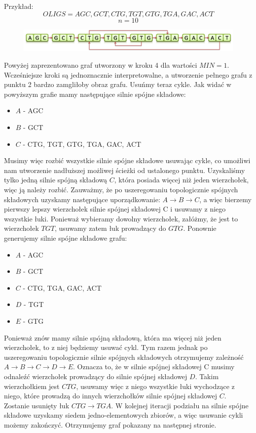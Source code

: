 \documentclass[a4paper,10pt]{article}
\begin{document}
Przykład:
$$OLIGS = { AGC, GCT, CTG, TGT, GTG, TGA, GAC, ACT }$$
$$n = 10$$

\begin{figure}[h]
  \footnotesize\centering
  \includegraphics[width=\textwidth,keepaspectratio]{Graph1.png}
\end{figure}

Powyżej zaprezentowano graf utworzony w kroku 4 dla wartości $MIN=1$. Wcześniejsze kroki są jednoznacznie interpretowalne, a utworzenie pełnego grafu z punktu 2 bardzo zamgliłoby obraz grafu. Usuńmy teraz cykle.
Jak widać w powyższym grafie mamy następujące silnie spójne składowe:
\begin{itemize}
 \item $A$ - {AGC}
 \item $B$ - {GCT}
 \item $C$ - {CTG, TGT, GTG, TGA, GAC, ACT}
\end{itemize}
Musimy więc rozbić wszystkie silnie spójne składowe usuwając cykle, co umożliwi nam utworzenie nadłuższej możliwej ścieżki od ustalonego punktu.
Uzyskaliśmy tylko jedną silnie spójną składową $C$, która posiada więcej niż jeden wierzchołek, więc ją należy rozbić. 
Zauważmy, że po uszeregowaniu topologicznie spójnych składowych uzyskamy następujące uporządkowanie: $A \rightarrow B \rightarrow C$, 
a więc bierzemy pierwszy lepszy wierzchołek silnie spójnej składowej C i usuwamy z niego wszystkie łuki. 
Ponieważ wybieramy dowolny wierzchołek, załóżmy, że jest to wierzchołek $TGT$, usuwamy zatem łuk prowadzący do $GTG$.
Ponownie generujemy silnie spójne składowe grafu:
\begin{itemize}
 \item $A$ - {AGC}
 \item $B$ - {GCT}
 \item $C$ - {CTG, TGA, GAC, ACT}
 \item $D$ - {TGT}
 \item $E$ - {GTG}
\end{itemize}
Ponieważ znów mamy silnie spójną składową, która ma więcej niż jeden wierzchołek, to z niej będziemy usuwać cykl. 
Tym razem jednak po uszeregowaniu topologicznie silnie spójnych składowych otrzymujemy zależność $A \rightarrow B \rightarrow C \rightarrow D \rightarrow E$. 
Oznacza to, że w silnie spójnej składowej C musimy odnaleźć wierzchołek prowadzący do silnie spójnej składowej $D$. 
Takim wierzchołkiem jest $CTG$, usuwamy więc z niego wszystkie łuki wychodzące z niego, które prowadzą do innych 
wierzchołków silnie spójnej składowej $C$. Zostanie usunięty łuk $CTG \rightarrow TGA$.
W kolejnej iteracji podziału na silnie spójne składowe uzyskamy siedem jedno-elementowych zbiorów, a więc usuwanie 
cykli możemy zakończyć. Otrzymujemy graf pokazany na następnej stronie.
\end{document}
